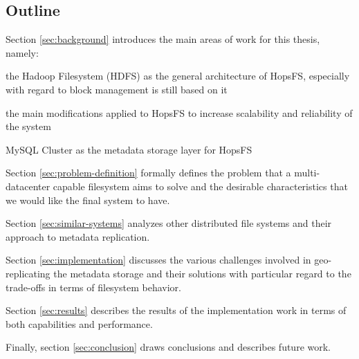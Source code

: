 \subsection{Outline}

Section \ref{sec:background} introduces the main areas of work for this thesis, namely:
\begin{inparaenum}[1)]
\item the Hadoop Filesystem (HDFS) as the general architecture of HopsFS, especially with regard to block management is still based on it
\item the main modifications applied to HopsFS to increase scalability and reliability of the system
\item MySQL Cluster as the metadata storage layer for HopsFS
\end{inparaenum}

Section \ref{sec:problem-definition} formally defines the problem that a multi-datacenter capable filesystem aims to solve and the desirable characteristics that we would like the final system to have.

Section \ref{sec:similar-systems} analyzes other distributed file systems and their approach to metadata replication.

Section \ref{sec:implementation} discusses the various challenges involved in geo-replicating the metadata storage and their solutions with particular regard to the trade-offs in terms of filesystem behavior.

Section \ref{sec:results} describes the results of the implementation work in terms of both capabilities and performance.

Finally, section \ref{sec:conclusion} draws conclusions and describes future work.

